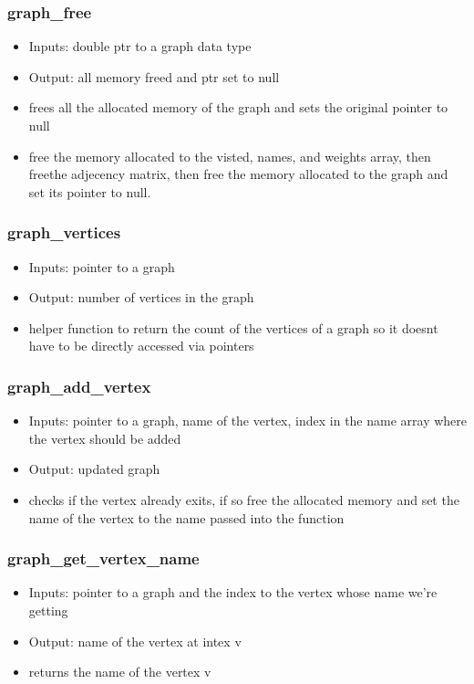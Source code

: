 \documentclass{article}
\begin{document}
\subsubsection{graph\_free}
\begin{itemize}
    \item Inputs: double ptr to a graph data type
    \item Output: all memory freed and ptr set to null
    \item frees all the allocated memory of the graph  and sets the original pointer to null
    \item free the memory allocated to the visted, names, and weights array, then freethe adjecency matrix, then free the memory allocated to the graph and set its pointer to null.
\end{itemize}
\subsubsection{graph\_vertices}
\begin{itemize}
    \item Inputs: pointer to a graph  
    \item Output: number of vertices in the graph
    \item helper function to return the count of the vertices of a graph so it doesnt have to be directly accessed via pointers
\end{itemize}
\subsubsection{graph\_add\_vertex}
\begin{itemize}
    \item Inputs: pointer to a graph, name of the vertex, index in the name array where the vertex should be added
    \item Output: updated graph 
    \item checks if the vertex already exits, if so free the allocated memory and set the name of the vertex to the name passed into the function 
\end{itemize}
\subsubsection{graph\_get\_vertex\_name}
\begin{itemize}
    \item Inputs: pointer to a graph and the index to the vertex whose name we're getting 
    \item Output: name of the vertex at intex v
    \item returns the name of the vertex v 
\end{itemize}
\end{document}
